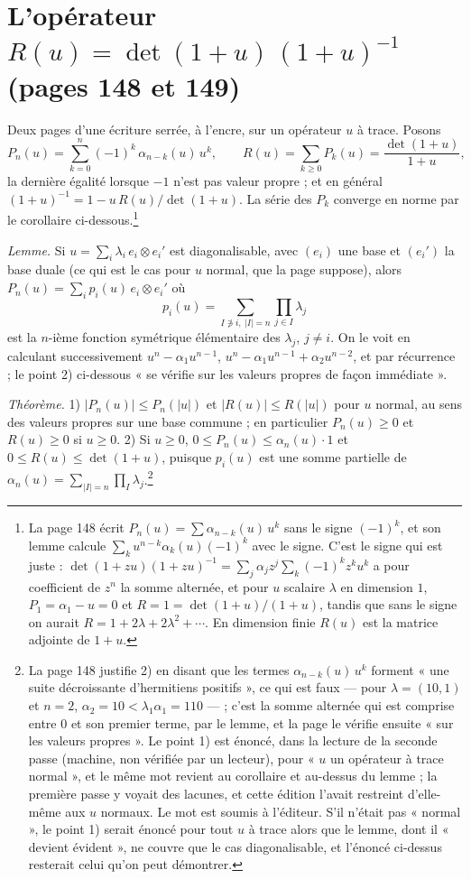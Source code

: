 \documentclass[11pt,a4paper]{article}
\begin{document}
\section*{L'opérateur $R(u) = \det(1+u)\,(1+u)^{-1}$ (pages 148 et 149)}

Deux pages d'une écriture serrée, à l'encre, sur un opérateur $u$ à trace.
Posons
\[
  P_n(u) = \sum_{k=0}^{n} (-1)^k\,\alpha_{n-k}(u)\,u^k, \qquad
  R(u) = \sum_{k \geq 0} P_k(u) = \frac{\det(1+u)}{1+u},
\]
la dernière égalité lorsque $-1$ n'est pas valeur propre ; et en général
$(1+u)^{-1} = 1 - u\,R(u)/\det(1+u)$. La série des $P_k$ converge en norme
par le corollaire ci-dessous.\footnote{La page 148 écrit $P_n(u) = \sum
\alpha_{n-k}(u)\,u^k$ sans le signe $(-1)^k$, et son lemme calcule $\sum_k
u^{n-k}\alpha_k(u)(-1)^k$ avec le signe. C'est le signe qui est juste :
$\det(1+zu)(1+zu)^{-1} = \sum_j \alpha_j z^j\sum_k (-1)^k z^k u^k$ a pour
coefficient de $z^n$ la somme alternée, et pour $u$ scalaire $\lambda$ en
dimension $1$, $P_1 = \alpha_1 - u = 0$ et $R = 1 = \det(1+u)/(1+u)$, tandis
que sans le signe on aurait $R = 1 + 2\lambda + 2\lambda^2 + \cdots$. En
dimension finie $R(u)$ est la matrice adjointe de $1 + u$.}

\emph{Lemme.} Si $u = \sum_i \lambda_i\,e_i \otimes e_i'$ est diagonalisable,
avec $(e_i)$ une base et $(e_i')$ la base duale (ce qui est le cas pour
$u$ normal, que la page suppose), alors $P_n(u) = \sum_i
p_i(u)\,e_i \otimes e_i'$ où
\[
  p_i(u) = \sum_{I \not\ni i,\ |I| = n} \prod_{j \in I} \lambda_j
\]
est la $n$-ième fonction symétrique élémentaire des $\lambda_j$, $j \neq i$.
On le voit en calculant successivement $u^n - \alpha_1 u^{n-1}$, $u^n -
\alpha_1 u^{n-1} + \alpha_2 u^{n-2}$, et par récurrence ; le point 2)
ci-dessous « se vérifie sur les valeurs propres de façon immédiate ».

\emph{Théorème.} 1) $|P_n(u)| \leq P_n(|u|)$ et $|R(u)| \leq R(|u|)$ pour $u$
normal, au sens des valeurs propres sur une base commune ; en particulier
$P_n(u) \geq 0$ et $R(u) \geq 0$ si $u \geq 0$. 2) Si $u \geq 0$, $0 \leq
P_n(u) \leq \alpha_n(u)\cdot 1$ et $0 \leq R(u) \leq \det(1+u)$, puisque
$p_i(u)$ est une somme partielle de $\alpha_n(u) = \sum_{|I| = n}\prod_I
\lambda_j$.\footnote{La page 148 justifie 2) en disant que les termes
$\alpha_{n-k}(u)\,u^k$ forment « une suite décroissante d'hermitiens
positifs », ce qui est faux --- pour $\lambda = (10, 1)$ et $n = 2$,
$\alpha_2 = 10 < \lambda_1\alpha_1 = 110$ --- ; c'est la somme alternée qui
est comprise entre $0$ et son premier terme, par le lemme, et la page le
vérifie ensuite « sur les valeurs propres ». Le point 1) est énoncé, dans la
lecture de la seconde passe (machine, non vérifiée par un lecteur), pour
« $u$ un opérateur à trace normal », et le même mot revient au corollaire et
au-dessus du lemme ; la première passe y voyait des lacunes, et cette
édition l'avait restreint d'elle-même aux $u$ normaux. Le mot est soumis à
l'éditeur. S'il n'était pas « normal », le point 1) serait énoncé pour tout
$u$ à trace alors que le lemme, dont il « devient évident », ne couvre que
le cas diagonalisable, et l'énoncé ci-dessus resterait celui qu'on peut
démontrer.}
\end{document}
